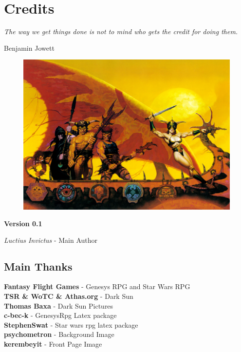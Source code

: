 \chapter{Credits}\label{chap:credits}
\epigraph{\textit{
    The way we get things done is not to mind who gets the credit for doing them.
} }{
    Benjamin Jowett
}

\begin{figure}[H]
\centering
\includegraphics[width=0.4\linewidth]{images/bromdarksun.jpg}
\end{figure}

\begin{centering}
    \textbf{Version 0.1}\\
\end{centering}

\begin{centering}
\textit{Luctius Invictus} - Main Author\\
\end{centering}

\section{Main Thanks}
\begin{centering}
\textbf{Fantasy Flight Games} - Genesys RPG and Star Wars RPG\\
\textbf{TSR \& WoTC \& Athas.org} - Dark Sun\\
\textbf{Thomas Baxa} - Dark Sun Pictures\\
\textbf{c-bec-k} - GenesysRpg Latex package\\
\textbf{StephenSwat} - Star wars rpg latex package\\
\textbf{psychometron} - Background Image\\
\textbf{kerembeyit} - Front Page Image\\
\end{centering}

